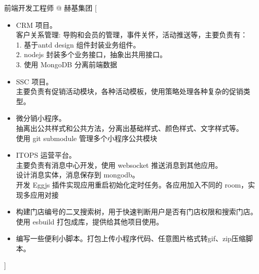 \documentclass[zh]{resume}
\begin{document}
\begin{experiences}
    {前端开发工程师 @ 赫基集团}%
    [\begin{itemize}
      \item CRM 项目。\\ 客户关系管理: 导购和会员的管理，事件关怀，活动推送等，主要负责有：\\ 1. 基于antd design 组件封装业务组件。\\ 2. nodejs 封装多个业务接口，抽象出共用接口。 \\ 3. 使用 MongoDB 分离前端数据
      \item SSC 项目。\\ 主要负责有促销活动模块，各种活动模板，使用策略处理各种复杂的促销类型。
      \item 微分销小程序。\\ 抽离出公共样式和公共方法，分离出基础样式、颜色样式、文字样式等。\\ 使用 git submodule 管理多个小程序公共模块
      \item ITOPS 运营平台。\\ 主要负责有消息中心开发，使用 websocket 推送消息到其他应用。\\ 设计消息实体，消息保存到 mongodb。\\ 开发 Eggjs 插件实现应用重启初始化定时任务。各应用加入不同的 room，实现多应用对接
      \item 构建门店编号的二叉搜索树，用于快速判断用户是否有门店权限和搜索门店。使用 esbuild 打包成库，提供给其他项目使用。
      \item 编写一些便利小脚本。打包上传小程序代码、任意图片格式转gif、zip压缩脚本。
    \end{itemize}]

\end{experiences}
\end{document}
